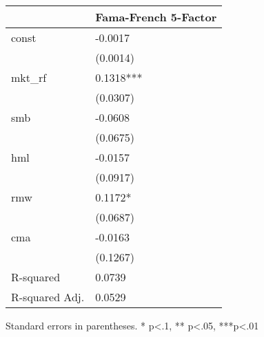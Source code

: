 \begin{table}
\caption{}
\label{}
\begin{center}
\begin{tabular}{ll}
\hline
               & Fama-French 5-Factor  \\
\hline
const          & -0.0017               \\
               & (0.0014)              \\
mkt\_rf        & 0.1318***             \\
               & (0.0307)              \\
smb            & -0.0608               \\
               & (0.0675)              \\
hml            & -0.0157               \\
               & (0.0917)              \\
rmw            & 0.1172*               \\
               & (0.0687)              \\
cma            & -0.0163               \\
               & (0.1267)              \\
R-squared      & 0.0739                \\
R-squared Adj. & 0.0529                \\
\hline
\end{tabular}
\end{center}
\end{table}
\bigskip
Standard errors in parentheses. \newline 
* p<.1, ** p<.05, ***p<.01